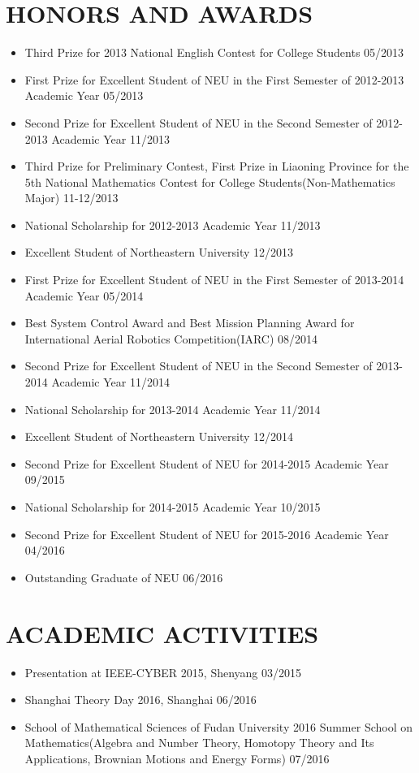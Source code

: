 \documentclass[margin, 10pt]{res} %
\begin{document}
\begin{resume}
\section{HONORS AND AWARDS}
\begin{itemize}
\item Third Prize for 2013 National English Contest for College Students \hfill 05/2013 
\item First Prize for Excellent Student of NEU in the First Semester of 2012-2013 Academic Year \hfill 05/2013
\item Second Prize for Excellent Student of NEU in the Second Semester of 2012-2013 Academic Year \hfill 11/2013
\item Third Prize for Preliminary Contest, First Prize in Liaoning Province for the 5th National Mathematics Contest for College Students(Non-Mathematics Major) \hfill 11-12/2013 
\item National Scholarship for 2012-2013 Academic Year \hfill 11/2013 
\item Excellent Student of Northeastern University \hfill 12/2013 
\item First Prize for Excellent Student of NEU in the First Semester of 2013-2014 Academic Year \hfill 05/2014
\item Best System Control Award and Best Mission Planning Award for International Aerial Robotics Competition(IARC) \hfill 08/2014 
\item Second Prize for Excellent Student of NEU in the Second Semester of 2013-2014 Academic Year \hfill 11/2014
\item National Scholarship for 2013-2014 Academic Year \hfill 11/2014 
\item Excellent Student of Northeastern University \hfill 12/2014 
\item Second Prize for Excellent Student of NEU for 2014-2015 Academic Year \hfill 09/2015 
\item National Scholarship for 2014-2015 Academic Year \hfill 10/2015 
\item Second Prize for Excellent Student of NEU for 2015-2016 Academic Year \hfill 04/2016 
\item Outstanding Graduate of NEU \hfill 06/2016
\end{itemize}

\section{ACADEMIC ACTIVITIES}
\begin{itemize}
\item Presentation at IEEE-CYBER 2015, Shenyang \hfill 03/2015 
\item Shanghai Theory Day 2016, Shanghai \hfill 06/2016
\item School of Mathematical Sciences of Fudan University 2016 Summer School on Mathematics(Algebra and Number Theory, Homotopy Theory and Its Applications, Brownian Motions and Energy Forms) \hfill 07/2016
\end{itemize}


\end{resume}
\end{document}
